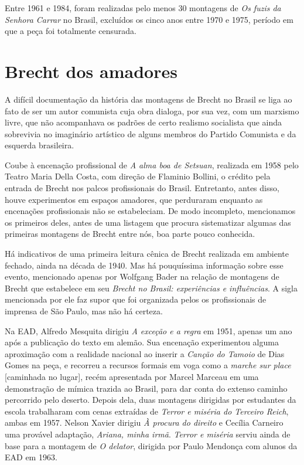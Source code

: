 Entre 1961 e 1984, foram realizadas pelo menos 30 montagens de \textit{Os
fuzis da Senhora Carrar} no Brasil, excluídos os cinco anos entre 1970 e
1975, período em que a peça foi totalmente censurada.

\section{Brecht dos amadores}

A difícil documentação da história das montagens de Brecht no Brasil se
liga ao fato de ser um autor comunista cuja obra dialoga, por sua vez,
com um marxismo livre, que não acompanhava os padrões de certo realismo
socialista que ainda sobrevivia no imaginário artístico de alguns
membros do Partido Comunista e da esquerda brasileira.

Coube à encenação profissional de \textit{A alma boa de Setsuan}, realizada
em 1958 pelo Teatro Maria Della Costa, com direção de Flaminio Bollini,
o crédito pela entrada de Brecht nos palcos profissionais do Brasil.
Entretanto, antes disso, houve experimentos em espaços amadores, que
perduraram enquanto as encenações profissionais não se estabeleciam. De
modo incompleto, mencionamos os primeiros deles, antes de uma listagem
que procura sistematizar algumas das primeiras montagens de Brecht entre
nós, boa parte pouco conhecida.

Há indicativos de uma primeira leitura cênica de Brecht realizada em
ambiente fechado, ainda na década de 1940. Mas há pouquíssima informação
sobre esse evento, mencionado apenas por Wolfgang Bader na relação de
montagens de Brecht que estabelece em seu \textit{Brecht no Brasil:
experiências e influências}. A sigla mencionada por ele faz supor que
foi organizada pelos os profissionais de imprensa de São Paulo, mas não
há certeza.

Na EAD, Alfredo Mesquita dirigiu \textit{A exceção e a regra} em 1951,
apenas um ano após a publicação do texto em alemão. Sua encenação
experimentou alguma aproximação com a realidade nacional ao inserir a
\textit{Canção do Tamoio} de Dias Gomes na peça, e recorreu a recursos
formais em voga como a \textit{marche sur place} {[}caminhada no lugar{]},
recém apresentada por Marcel Marceau em uma demonstração de mímica
trazida ao Brasil, para dar conta do extenso caminho percorrido pelo
deserto. Depois dela, duas montagens dirigidas por estudantes da escola
trabalharam com cenas extraídas de \textit{Terror e miséria do Terceiro
Reich}, ambas em 1957. Nelson Xavier dirigiu \textit{À procura do direito}
e Cecília Carneiro uma provável adaptação, \textit{Ariana, minha irmã}.
\textit{Terror e miséria} serviu ainda de base para a montagem de \textit{O
delator}, dirigida por Paulo Mendonça com alunos da EAD em 1963.

